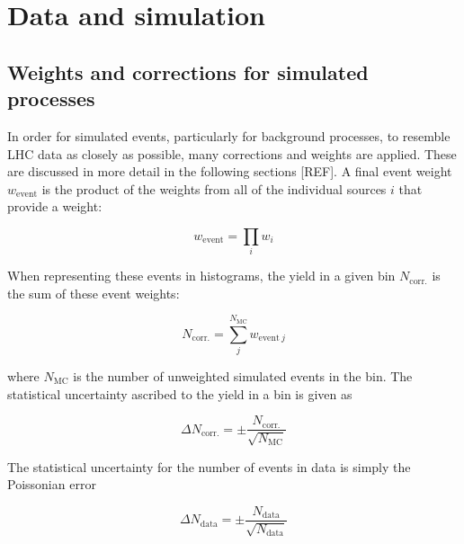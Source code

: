 

\section{Data and simulation}
\label{sec:htoinv_data_sim}




\subsection{Weights and corrections for simulated processes}
\label{subsec:htoinv_mc_corrections}

In order for simulated events, particularly for background processes, to resemble LHC data as closely as possible, many corrections and weights are applied. These are discussed in more detail in the following sections [REF]. A final event weight $w_{\mathrm{event}}$ is the product of the weights from all of the individual sources $i$ that provide a weight:

\begin{equation}
\label{eq:event_weight}
w_{\mathrm{event}} = \prod_i w_i
\end{equation}

When representing these events in histograms, the yield in a given bin $N_{\mathrm{corr.}}$ is the sum of these event weights:

\begin{equation}
\label{eq:bin_weight}
N_{\mathrm{corr.}} = \sum_j^{N_{\mathrm{MC}}} w_{\mathrm{event} \ j}
\end{equation}

where $N_{\mathrm{MC}}$ is the number of unweighted simulated events in the bin. The statistical uncertainty ascribed to the yield in a bin is given as

\begin{equation}
\Delta N_{\mathrm{corr.}} = \pm \frac{ N_{\mathrm{corr.}} }{ \sqrt{N_{\mathrm{MC}}} }
\label{eq:uncertainty_mc_ours}
\end{equation}

The statistical uncertainty for the number of events in data is simply the Poissonian error

\begin{equation}
\Delta N_{\mathrm{data}} = \pm \frac{ N_{\mathrm{data}} }{ \sqrt{N_{\mathrm{data}}} }
\label{eq:uncertainty_data}
\end{equation}

